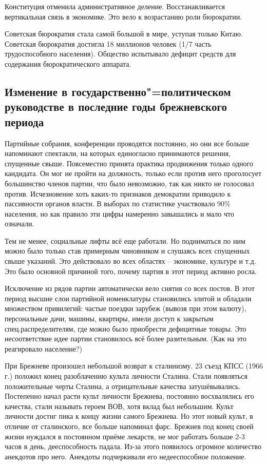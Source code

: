 Конституция отменила административное деление. Восстанавливается вертикальная связь в экономике. Это вело к возрастанию роли бюрократии. 

Советская бюрократия стала самой большой в мире, уступая только Китаю. Советская бюрократия достигла 18 миллионов человек (1/7 часть трудоспособного населения). Общество испытывало дефицит средств для содержания бюрократического аппарата.

\subsection{Изменение в государственно"=политическом руководстве в последние годы брежневского периода}

Партийные собрания, конференции проводятся постоянно, но они все больше напоминают спектакли, на которых единогласно принимаются решения, спущенные свыше. Повсеместно принята практика продвижения только одного кандидата. Он мог не пройти на должность, только если против него проголосует большинство членов партии, что было невозможно, так как никто не голосовал против. Исчезновение хоть каких-то признаков демократии приводило к пассивности органов власти. В выборах по статистике участвовало 90\% населения, но как правило эти цифры намеренно завышались и мало что означали.

Тем не менее, социальные лифты всё еще работали. Но подниматься по ним можно было только став примерным чиновником и слушаясь всех спущенных свыше указаний. Это действовало во всех областях – экономике, культуре и т.д. Это было основной причиной того, почему партия в этот период активно росла. 

Исключение из рядов партии автоматически вело снятия со всех постов.
В этот период высшие слои партийной номенклатуры становились элитой и обладали множеством привилегий: частые поездки зарубеж (вывозя при этом валюту), персональные дачи, машины, квартиры, имели доступ к закрытым спец.распределителям, где можно было приобрести дефицитные товары. Это несоответствие идее партии становилось всё более разительным. (Как на это реагировало население?)

При Брежневе произошел небольшой возврат к сталинизму. 23 съезд КПСС (1966 г.) положил конец разоблачению культа личности Сталина. Стали появляться положительные черты Сталина, а отрицательные качества затушёвывались. Постепенно начал расти культ личности Брежнева, постоянно восхвалялись его качества, стали называть героем ВОВ, хотя вклад был небольшим. Культ личности достиг пика к концу жизни самого Брежнева. Но этот новый культ, в отличие от сталинского, все больше напоминал фарс. Брежнев под конец своей жизни нуждался в постоянном приёме лекарств, не мог работать больше 2-3 часов в день, дееспособность падала. Из-за этого появилось огромное количество анекдотов про него. Анекдоты подчеркивали его недееспособное положение.

